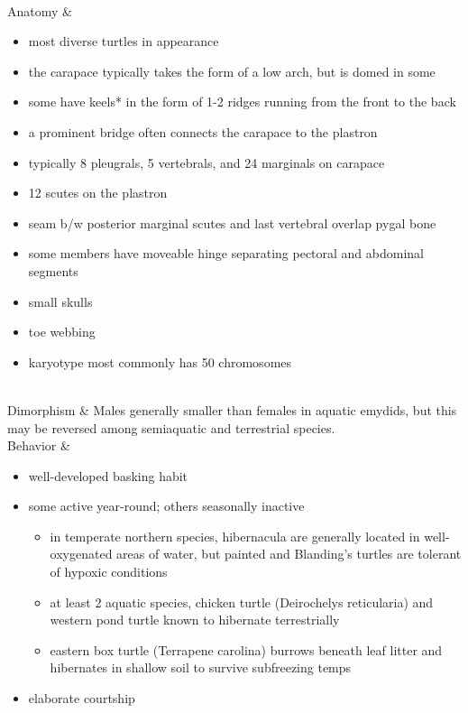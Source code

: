 \begin{center}
\begin{longtabu}
	 \\
	\hline
	Anatomy &
	\begin{itemize}[noitemsep]
		\item most diverse turtles in appearance
		\item the carapace typically takes the form of a low arch, but is domed in some
		\item some have keels* in the form of 1-2 ridges running from the front to the back
		\item a prominent bridge often connects the carapace to the plastron
		\item typically 8 pleugrals, 5 vertebrals, and 24 marginals on carapace
		\item 12 scutes on the plastron
		\item seam b/w posterior marginal scutes and last vertebral overlap pygal bone
		\item some members have moveable hinge separating pectoral and abdominal segments
		\item small skulls
		\item toe webbing
		\item karyotype most commonly has 50 chromosomes
	\end{itemize}
	 \\
	\hline
	Dimorphism & 
	Males generally smaller than females in aquatic emydids, but this may be reversed among semiaquatic and terrestrial species.
	\\
	\hline
	Behavior & 
	\begin{itemize}[noitemsep]
		\item well-developed basking habit
		\item some active year-round; others seasonally inactive
			\begin{itemize}[noitemsep]
				\item in temperate northern species, hibernacula are generally located in well-oxygenated areas of water, but painted and Blanding's turtles are tolerant of hypoxic conditions
				\item at least 2 aquatic species, chicken turtle (Deirochelys reticularia) and western pond turtle known to hibernate terrestrially
				\item eastern box turtle  (Terrapene carolina) burrows beneath leaf litter and hibernates in shallow soil to survive subfreezing temps
			\end{itemize}
		\item elaborate courtship
	\end{itemize}

\end{longtabu}
\end{center}
